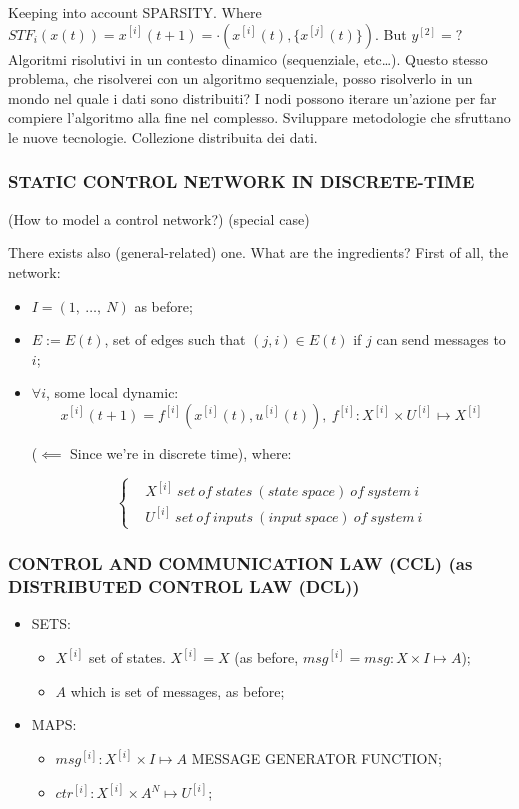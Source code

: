 Keeping into account SPARSITY. Where $STF_i(x(t)) = x^{[i]}(t+1) = \mathord{\cdot}(x^{[i]}(t),\{x^{[j]}(t)\})$. But $y^{[2]}=?$ Algoritmi risolutivi in un contesto dinamico (sequenziale, etc\dots). Questo stesso problema, che risolverei con un algoritmo sequenziale, posso risolverlo in un mondo nel quale i dati sono distribuiti? I nodi possono iterare un'azione per far compiere l'algoritmo alla fine nel complesso. Sviluppare metodologie che sfruttano le nuove tecnologie. Collezione distribuita dei dati.

\subsubsection{STATIC CONTROL NETWORK IN DISCRETE-TIME}

(How to model a control network?) (special case)

There exists also (general-related) one. What are the ingredients? First of all, the network:

\begin{itemize}
\item $I=(1,\ \dots,\ N)$ as before;
\item $E:=E(t)$, set of edges such that $(j,i)\in E(t)$ if $j$ can send messages to $i$;
\item $\forall i$, some local dynamic:
\[
	x^{[i]}(t+1) = f^{[i]}(x^{[i]}(t), u^{[i]}(t)),\ f^{[i]}:X^{[i]}\times U^{[i]} \mapsto X^{[i]}
\]

($\impliedby$ Since we're in discrete time), where:

\[
	\left\{
	\begin{aligned}
	&X^{[i]}\ set\ of\ states\ (state\ space)\ of\ system\ i\\
	&U^{[i]}\ set\ of\ inputs\ (input\ space)\ of\ system\ i
	\end{aligned} 
	\right.
\]
\end{itemize}

\subsubsection{CONTROL AND COMMUNICATION LAW (CCL) (as DISTRIBUTED CONTROL LAW (DCL))}
\begin{itemize}
\item SETS:
\begin{itemize}
\item $X^{[i]}$ set of states. $X^{[i]}=X$ (as before, $msg^{[i]}=msg:X\times I \mapsto A$);
\item $A$ which is set of messages, as before;
\end{itemize}
\item MAPS:
\begin{itemize}
\item $msg^{[i]}:X^{[i]}\times I \mapsto A$ MESSAGE GENERATOR FUNCTION;
\item $ctr^{[i]}:X^{[i]}\times A^N \mapsto U^{[i]}$;
\end{itemize}
\end{itemize}

